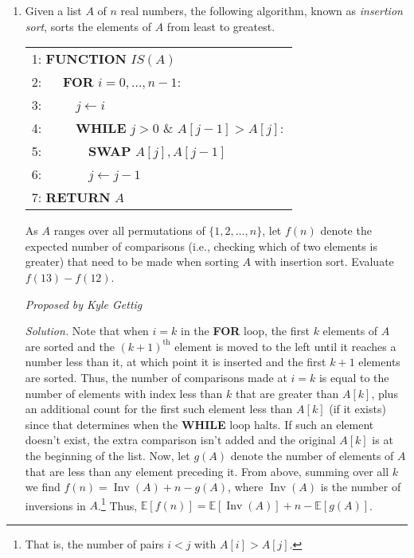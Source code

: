 \documentclass[10pt]{article}
\newcommand{\proposed}[1]
{
\vspace{5pt}
\noindent\textit{Proposed by #1}
}
\newcommand{\solution}
{
\vspace{5pt}
\noindent\textit{Solution.}\qquad
}
\begin{document}
\begin{enumerate}
\item Given a list $A$ of $n$ real numbers, the following algorithm, known as \textit{insertion sort}, sorts the elements of $A$ from least to greatest.

	\begin{tabular}{l}
		1: \textbf{FUNCTION} $IS(A)$ \\
		2: $\quad$ \textbf{FOR} $i=0,\ldots, n-1$: \\
		3: $\quad\quad$ $j \leftarrow i$\\
		4: $\quad\quad$ \textbf{WHILE} $j>0$ \& $A[j-1]>A[j]:$\\
		5: $\quad\quad\quad$ \textbf{SWAP} $A[j], A[j-1]$\\
		6: $\quad\quad\quad$ $j \leftarrow j-1$\\
		7: \textbf{RETURN} $A$
	\end{tabular}

	As $A$ ranges over all permutations of $\{1, 2, \ldots, n\}$, let $f(n)$ denote the expected number of comparisons (i.e., checking which of two elements is greater) that need to be made when sorting $A$ with insertion sort. Evaluate $f(13) - f(12)$.

\proposed{Kyle Gettig}

\solution Note that when $i=k$ in the \textbf{FOR} loop, the first $k$ elements of $A$ are sorted and the $(k+1)^{\text{th}}$ element is moved to the left until it reaches a number less than it, at which point it is inserted and the first $k+1$ elements are sorted. Thus, the number of comparisons made at $i=k$ is equal to the number of elements with index less than $k$ that are greater than $A[k]$, plus an additional count for the first such element less than $A[k]$ (if it exists) since that determines when the \textbf{WHILE} loop halts. If such an element doesn't exist, the extra comparison isn't added and the original $A[k]$ is at the beginning of the list. Now, let $g(A)$ denote the number of elements of $A$ that are less than any element preceding it. From above, summing over all $k$ we find $f(n) = \operatorname{Inv}(A) + n - g(A)$, where $\operatorname{Inv}(A)$ is the number of inversions in $A$.\footnote{That is, the number of pairs $i < j$ with $A[i] > A[j]$.} Thus, $\mathbb{E}[f(n)] = \mathbb{E}[\operatorname{Inv}(A)] + n - \mathbb{E}[g(A)]$.


\end{enumerate}
\end{document}
